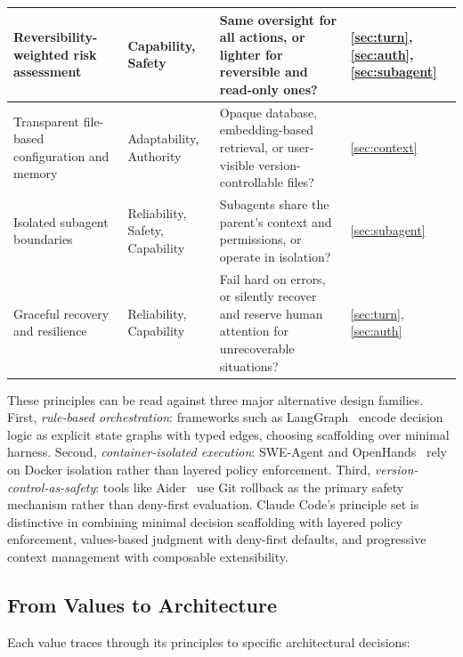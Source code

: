 \begin{table}[t]
\begin{tabularx}{\textwidth}{@{}>{\raggedright\arraybackslash}m{3.8cm}>{\raggedright\arraybackslash}m{3.2cm}>{\raggedright\arraybackslash}X>{\centering\arraybackslash}m{1.2cm}@{}}
\midrule
Reversibility-weighted risk assessment & Capability, Safety & Same oversight for all actions, or lighter for reversible and read-only ones? & \ref{sec:turn}, \ref{sec:auth}, \ref{sec:subagent} \\
\midrule
Transparent file-based configuration and memory & Adaptability, Authority & Opaque database, embedding-based retrieval, or user-visible version-controllable files? & \ref{sec:context} \\
\midrule
Isolated subagent boundaries & Reliability, Safety, Capability & Subagents share the parent's context and permissions, or operate in isolation? & \ref{sec:subagent} \\
\midrule
Graceful recovery and resilience & Reliability, Capability & Fail hard on errors, or silently recover and reserve human attention for unrecoverable situations? & \ref{sec:turn}, \ref{sec:auth} \\
\bottomrule
\end{tabularx}
\end{table}


These principles can be read against three major alternative design families. First, \emph{rule-based orchestration}: frameworks such as LangGraph~\citep{langgraph2024} encode decision logic as explicit state graphs with typed edges, choosing scaffolding over minimal harness. Second, \emph{container-isolated execution}: SWE-Agent and OpenHands~\citep{yang2024sweagent,wang2024openhands} rely on Docker isolation rather than layered policy enforcement. Third, \emph{version-control-as-safety}: tools like Aider~\citep{gauthier2024aider} use Git rollback as the primary safety mechanism rather than deny-first evaluation. Claude Code's principle set is distinctive in combining minimal decision scaffolding with layered policy enforcement, values-based judgment with deny-first defaults, and progressive context management with composable extensibility.

\subsection{From Values to Architecture}
\label{sec:values:bridge}

Each value traces through its principles to specific architectural decisions:

